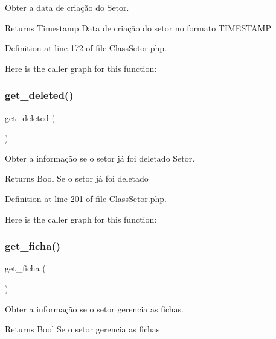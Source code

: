 Obter a data de criação do Setor. 

\begin{DoxyReturn}{Returns}
Timestamp Data de criação do setor no formato T\+I\+M\+E\+S\+T\+A\+MP 
\end{DoxyReturn}


Definition at line 172 of file Class\+Setor.\+php.

Here is the caller graph for this function\+:
\mbox{\label{class_class_setor_ad6172a0f313f12f05c08efc37a9c3656}} 
\subsubsection{\texorpdfstring{get\+\_\+deleted()}{get\_deleted()}}
{\footnotesize\ttfamily get\+\_\+deleted (\begin{DoxyParamCaption}{ }\end{DoxyParamCaption})}



Obter a informação se o setor já foi deletado Setor. 

\begin{DoxyReturn}{Returns}
Bool Se o setor já foi deletado 
\end{DoxyReturn}


Definition at line 201 of file Class\+Setor.\+php.

Here is the caller graph for this function\+:
\mbox{\label{class_class_setor_ac2cfa14d360149ee30216aec7e50cb20}} 
\subsubsection{\texorpdfstring{get\+\_\+ficha()}{get\_ficha()}}
{\footnotesize\ttfamily get\+\_\+ficha (\begin{DoxyParamCaption}{ }\end{DoxyParamCaption})}



Obter a informação se o setor gerencia as fichas. 

\begin{DoxyReturn}{Returns}
Bool Se o setor gerencia as fichas 
\end{DoxyReturn}



